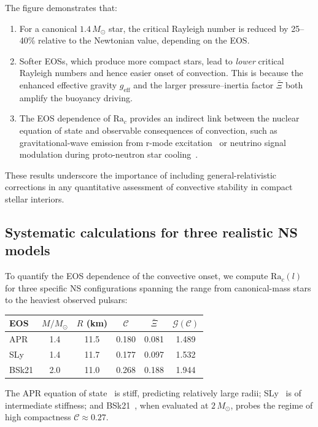 The figure demonstrates that:
\begin{enumerate}
\item[(i)] For a canonical $1.4\,M_{\odot}$ star, the critical
  Rayleigh number is reduced by 25--40\% relative to the Newtonian
  value, depending on the EOS.

\item[(ii)] Softer EOSs, which produce more compact stars,
  lead to \emph{lower} critical Rayleigh numbers and hence
  easier onset of convection.  This is because the enhanced
  effective gravity $g_{\mathrm{eff}}$ and the larger
  pressure--inertia factor $\bar{\Xi}$ both amplify the
  buoyancy driving.

\item[(iii)] The EOS dependence of $\mathrm{Ra}_{c}$ provides
  an indirect link between the nuclear equation of state and
  observable consequences of convection, such as gravitational-wave
  emission from r-mode excitation~\cite{AnderssonKokkotas2001}
  or neutrino signal modulation during proto-neutron star
  cooling~\cite{BurrowsLattimer1986}.
\end{enumerate}

These results underscore the importance of including general-relativistic
corrections in any quantitative assessment of convective stability in
compact stellar interiors.

\subsection{Systematic calculations for three realistic NS models}
\label{sec:rel-59-3eos}

To quantify the EOS dependence of the convective onset, we compute
$\mathrm{Ra}_{c}(l)$ for three specific NS configurations spanning the
range from canonical-mass stars to the heaviest observed pulsars:
\begin{center}
\begin{tabular}{lccccc}
\hline
EOS & $M/M_{\odot}$ & $R$ (km) & $\mathscr{C}$ & $\bar{\Xi}$
  & $\mathcal{G}(\mathscr{C})$ \\
\hline
APR  & 1.4 & 11.5 & 0.180 & 0.081 & 1.489 \\
SLy  & 1.4 & 11.7 & 0.177 & 0.097 & 1.532 \\
BSk21 & 2.0 & 11.0 & 0.268 & 0.188 & 1.944 \\
\hline
\end{tabular}
\end{center}
The APR equation of state~\cite{AkmalPR1998} is stiff, predicting
relatively large radii; SLy~\cite{DouchinHaensel2001} is of
intermediate stiffness; and BSk21~\cite{PotekhinEtAl2013}, when
evaluated at $2\,M_{\odot}$, probes the regime of high compactness
$\mathscr{C}\approx 0.27$.

